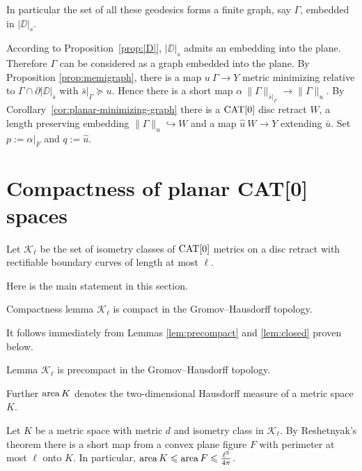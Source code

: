 \documentclass[a4paper,10pt]{amsart}
\begin{document}

In particular the set of all these geodesics forms a finite graph, say $\Gamma$,
embedded in $|\DD|_s$. 

According to Proposition~\ref{prop:|D|},
$|\DD|_s$ admits an embedding into the plane.
Therefore $\Gamma$ can be considered as a graph embedded into the plane.
By Proposition \ref{prop:memigraph}, there is a map $u\:\Gamma\to Y$ metric minimizing relative to $\Gamma\cap\partial|\DD|_{\bar s}$ with
$\bar s|_\Gamma\succcurlyeq u$. Hence there is a short map $\alpha\:\|\Gamma\|_{\bar s|_\Gamma}\to\|\Gamma\|_u$. 
By Corollary~\ref{cor:planar-minimizing-graph} there is a $\mathop{\rm CAT}\nolimits[0]$ disc retract $W$, a length preserving embedding
$\|\Gamma\|_u\hookrightarrow W$ and a map $\hat u\:W\to Y$ extending $\bar u$. Set $p:=\alpha|_F$ and $q:=\hat u$.
\qeds

\section{Compactness of planar CAT[0] spaces}

Let $\mathcal{K}_\ell$ be the set of isometry classes of $\mathop{\rm CAT}\nolimits[0]$ metrics on a disc retract with rectifiable
boundary curves of length at most $\ell$.


Here is the main statement in this section.

\begin{thm}{Compactness lemma}\label{lem:compact}
$\mathcal{K}_\ell$ is compact in the Gromov--Hausdorff topology.
\end{thm}

It follows immediately from Lemmas \ref{lem:precompact} and \ref{lem:closed} proven below.

\begin{thm}{Lemma}\label{lem:precompact}
$\mathcal{K}_\ell$ is precompact in the Gromov--Hausdorff topology.
\end{thm}

Further $\mathop{\rm area}\nolimits K$ denotes the two-dimensional Hausdorff measure of a metric space $K$. 

Let $K$ be a metric space with metric $d$ and isometry class in $\mathcal {K}_\ell$.
By Reshetnyak's theorem there is a short map from a convex plane figure $F$ with perimeter at most $\ell$ onto $K$.
In particular, $\mathop{\rm area}\nolimits K \leqslant \mathop{\rm area}\nolimits F \leqslant \tfrac{\ell^2}{4\pi}$.
\end{document}
